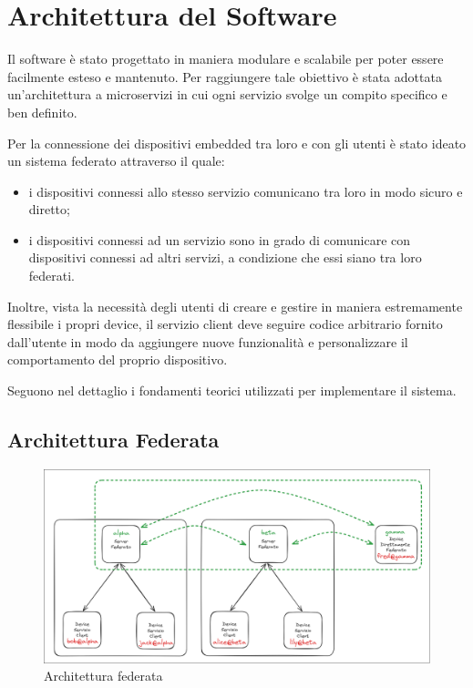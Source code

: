 \chapter{Architettura del Software}

Il software è stato progettato in maniera modulare e scalabile per poter essere facilmente esteso e mantenuto.
Per raggiungere tale obiettivo è stata adottata un'architettura a microservizi in cui ogni servizio svolge un compito specifico e ben definito.

Per la connessione dei dispositivi embedded tra loro e con gli utenti è stato ideato un sistema federato attraverso il quale:
\begin{itemize}
    \item i dispositivi connessi allo stesso servizio comunicano tra loro in modo sicuro e diretto;
    \item i dispositivi connessi ad un servizio sono in grado di comunicare con dispositivi connessi ad altri servizi, a condizione che essi siano tra loro federati.
\end{itemize}

Inoltre, vista la necessità degli utenti di creare e gestire in maniera estremamente flessibile i propri device, il servizio client deve
seguire codice arbitrario fornito dall'utente in modo da aggiungere nuove funzionalità e personalizzare il comportamento del proprio dispositivo.

Seguono nel dettaglio i fondamenti teorici utilizzati per implementare il sistema.

\newpage

\section{Architettura Federata} 

\begin{figure}[h]
    \centering
    \includegraphics[width=1.0\textwidth]{images/chapter3/federation.png}
    \caption{Architettura federata}
    \label{fig:federated_architecture}
\end{figure}

